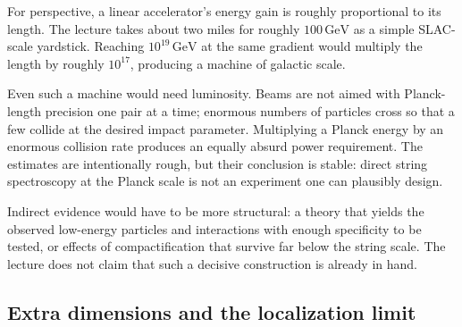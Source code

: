 \begin{classroomqa}
\end{classroomqa}

For perspective, a linear accelerator's energy gain is roughly proportional
to its length. The lecture takes about two miles for roughly
\(100\,\mathrm{GeV}\) as a simple SLAC-scale yardstick. Reaching
\(10^{19}\,\mathrm{GeV}\) at the same gradient would multiply the length by
roughly \(10^{17}\), producing a machine of galactic scale.

Even such a machine would need luminosity. Beams are not aimed with
Planck-length precision one pair at a time; enormous numbers of particles
cross so that a few collide at the desired impact parameter. Multiplying a
Planck energy by an enormous collision rate produces an equally absurd
power requirement. The estimates are intentionally rough, but their
conclusion is stable: direct string spectroscopy at the Planck scale is not
an experiment one can plausibly design.

Indirect evidence would have to be more structural: a theory that yields the
observed low-energy particles and interactions with enough specificity to be
tested, or effects of compactification that survive far below the string
scale. The lecture does not claim that such a decisive construction is
already in hand.

\subsection{Extra dimensions and the localization limit}

\begin{classroomqa}
\end{classroomqa}

